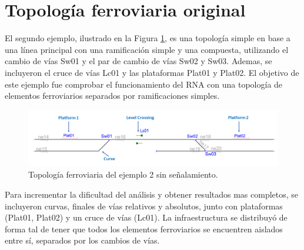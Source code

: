 \section{Topología ferroviaria original}

	El segundo ejemplo, ilustrado en la Figura \ref{fig:EJ2_1}, es una topología simple en base a una línea principal con una ramificación simple y una compuesta, utilizando el cambio de vías Sw01 y el par de cambio de vías Sw02 y Sw03. Ademas, se incluyeron el cruce de vías Lc01 y las plataformas Plat01 y Plat02. El objetivo de este ejemplo fue comprobar el funcionamiento del RNA con una topología de elementos ferroviarios separados por ramificaciones simples.
	
	\begin{figure}[H]
		\centering
		\includegraphics[width=1\textwidth]{resultados-obtenidos/ejemplo2/images/2_empty.png}
		\centering\caption{Topología ferroviaria del ejemplo 2 sin señalamiento.}
		\label{fig:EJ2_1}
	\end{figure}
	
	Para incrementar la dificultad del análisis y obtener resultados mas completos, se incluyeron curvas, finales de vías relativos y absolutos, junto con plataformas (Plat01, Plat02) y un cruce de vías (Lc01). La infraestructura se distribuyó de forma tal de tener que todos los elementos ferroviarios se encuentren aislados entre sí, separados por los cambios de vías.